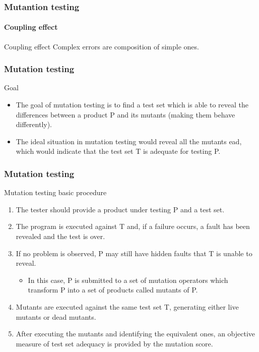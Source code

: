 \begin{frame}
\frametitle{Mutantion testing}
\framesubtitle{Coupling effect}

\begin{block:principle}{Coupling effect}
Complex errors are composition of simple ones.
\end{block:principle}
\end{frame}



\begin{frame}
\frametitle{Mutation testing}

\begin{block:fact}{Goal}
\begin{itemize}
    \item The goal of mutation testing is to find a test set which is able to
    reveal the differences between a product P and its mutants (making them
    behave differently).

	\item The ideal situation in mutation testing would reveal all the mutants
	ead, which would indicate that the test set T is adequate for testing P.
\end{itemize}
\end{block:fact}
\end{frame}


\begin{frame}
\frametitle{Mutation testing}

\begin{block:procedure}{Mutation testing basic procedure}
\begin{enumerate}
	\item The tester should provide a product under testing P and a test set.

 	\item The program is executed against T and, if a failure occurs, a fault
 	has been revealed and the test is over.

	\item If no problem is observed, P may still have hidden faults that T is
	unable to reveal.
	\begin{itemize}
		\item In this case, P is submitted to a set of mutation operators which
		transform P into a set of products called mutants of P.
	\end{itemize}

	\item Mutants are executed against the same test set T, generating either
	live mutants or dead mutants.

	\item After executing the mutants and identifying the equivalent ones, an
	objective measure of test set adequacy is provided by the mutation score.
\end{enumerate}
\end{block:procedure}
\end{frame}


